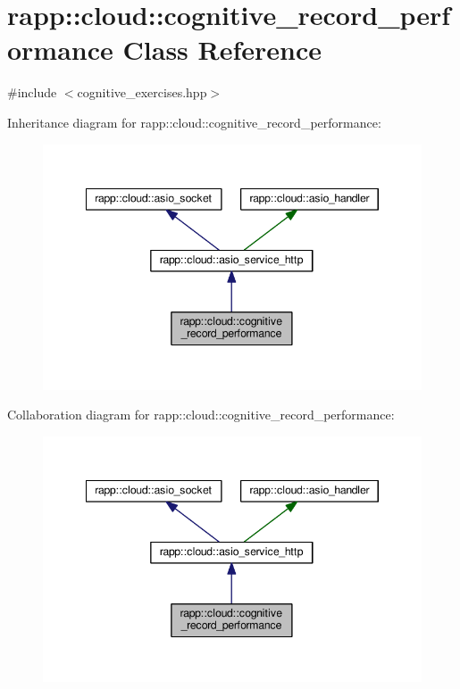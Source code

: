 \hypertarget{classrapp_1_1cloud_1_1cognitive__record__performance}{\section{rapp\-:\-:cloud\-:\-:cognitive\-\_\-record\-\_\-performance Class Reference}
\label{classrapp_1_1cloud_1_1cognitive__record__performance}
}


{\ttfamily \#include $<$cognitive\-\_\-exercises.\-hpp$>$}



Inheritance diagram for rapp\-:\-:cloud\-:\-:cognitive\-\_\-record\-\_\-performance\-:
\nopagebreak
\begin{figure}[H]
\begin{center}
\leavevmode
\includegraphics[width=345pt]{classrapp_1_1cloud_1_1cognitive__record__performance__inherit__graph}
\end{center}
\end{figure}


Collaboration diagram for rapp\-:\-:cloud\-:\-:cognitive\-\_\-record\-\_\-performance\-:
\nopagebreak
\begin{figure}[H]
\begin{center}
\leavevmode
\includegraphics[width=345pt]{classrapp_1_1cloud_1_1cognitive__record__performance__coll__graph}
\end{center}
\end{figure}
